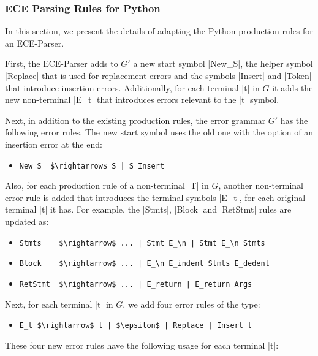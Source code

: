 \subsubsection{ECE Parsing Rules for Python}

In this section, we present the details of adapting the Python
production rules for an ECE-Parser.

First, the ECE-Parser adds to $G'$ a new start symbol |New_S|, the helper
symbol |Replace| that is used for replacement errors and the symbols |Insert|
and |Token| that introduce insertion errors. Additionally, for each terminal |t|
in $G$ it adds the new non-terminal |E_t| that introduces errors relevant to the
|t| symbol.

Next, in addition to the existing production rules, the error grammar $G'$ has
the following error rules. The new start symbol uses the old one with the option
of an insertion error at the end:
\begin{itemize}
  \item \lstinline{New_S  $\rightarrow$ S | S Insert}
\end{itemize}
Also, for each production rule of a non-terminal |T| in $G$, another
non-terminal error rule is added that introduces the terminal symbols |E_t|, for
each original terminal |t| it has. For example, the |Stmts|, |Block| and
|RetStmt| rules are updated as:
\begin{itemize}
  \item \lstinline{Stmts    $\rightarrow$ ... | Stmt E_\n | Stmt E_\n Stmts}
  \item \lstinline{Block    $\rightarrow$ ... | E_\n E_indent Stmts E_dedent}
  \item \lstinline{RetStmt  $\rightarrow$ ... | E_return | E_return Args}
\end{itemize}
Next, for each terminal |t| in $G$, we add four error rules of the type:
\begin{itemize}
  \item \lstinline{E_t $\rightarrow$ t | $\epsilon$ | Replace | Insert t}
\end{itemize}
These four new error rules have the following usage for each terminal |t|:
